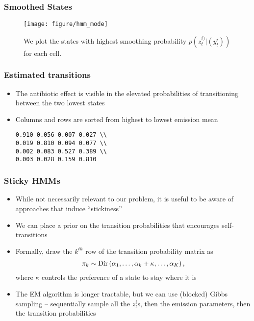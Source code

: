 \documentclass{beamer}
\begin{document}
\begin{frame}
  \frametitle{Smoothed States}
  \begin{figure}[ht]
  \centering
  \texttt{[image: figure/hmm\_mode]}
  \caption{We plot the states with highest smoothing probability
    $p\left(z_{t}^{i)} \vert \left(y_{t}^{i}\right)\right)$ for each cell.
    \label{fig:hmm_mode} }
\end{figure}
\end{frame}

\begin{frame}
  \frametitle{Estimated transitions}
  \begin{itemize}
    \item The antibiotic effect is visible in the elevated probabilities of
      transitioning between the two lowest states
      \item Columns and rows are sorted from highest to lowest emission mean
\begin{verbatim} 
0.910 0.056 0.007 0.027 \\
0.019 0.810 0.094 0.077 \\
0.002 0.083 0.527 0.389 \\
0.003 0.028 0.159 0.810 
\end{verbatim}
  \end{itemize}
\end{frame}

\begin{frame}
  \frametitle{Sticky HMMs}
\begin{itemize}
\item While not necessarily relevant to our problem, it is useful to be aware
of approaches that induce ``stickiness''
\item We can place a prior on the transition probabilities that encourages
  self-transitions
  \item Formally, draw the $k^{th}$ row of the transition probability matrix as
\begin{align*}
  \pi_{k} \sim \textnormal{Dir}\left(\alpha_{1}, \dots, \alpha_{k} + \kappa, \dots, \alpha_{K}\right),
\end{align*}
where $\kappa$ controls the preference of a state to stay where it is
\item The EM algorithm is longer tractable, but we can use (blocked) Gibbs
  sampling -- sequentially sample all the $z_{t}^{i}$s, then the emission
  parameters, then the transition probabilities
\end{itemize}
\end{frame}
\end{document}
